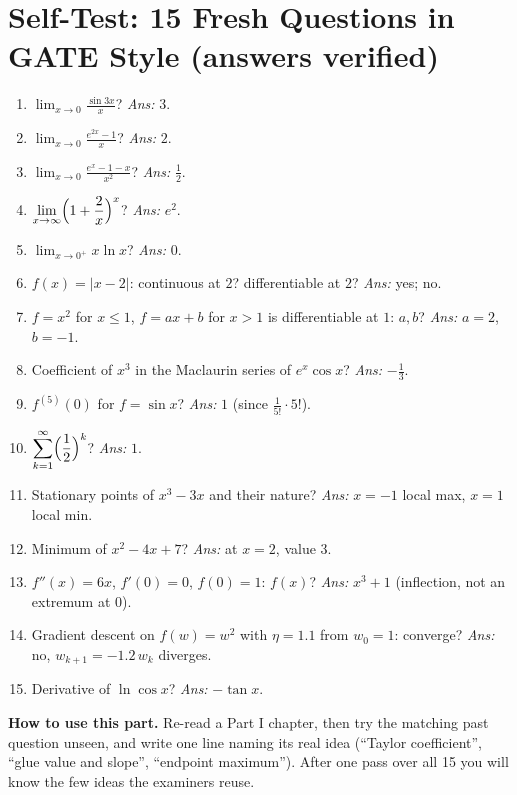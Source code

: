 \documentclass[11pt,a4paper]{article}
\begin{document}
\section{Self-Test: 15 Fresh Questions in GATE Style (answers verified)}
\begin{enumerate}[leftmargin=*,itemsep=3pt]
\item $\displaystyle\lim_{x\to0}\frac{\sin3x}{x}$? \emph{Ans:} $3$.
\item $\displaystyle\lim_{x\to0}\frac{e^{2x}-1}{x}$? \emph{Ans:} $2$.
\item $\displaystyle\lim_{x\to0}\frac{e^x-1-x}{x^2}$? \emph{Ans:} $\frac12$.
\item $\displaystyle\lim_{x\to\infty}\Bigl(1+\frac2x\Bigr)^x$? \emph{Ans:} $e^2$.
\item $\displaystyle\lim_{x\to0^+}x\ln x$? \emph{Ans:} $0$.
\item $f(x)=|x-2|$: continuous at $2$? differentiable at $2$? \emph{Ans:} yes; no.
\item $f=x^2$ for $x\le1$, $f=ax+b$ for $x>1$ is differentiable at $1$: $a,b$? \emph{Ans:} $a=2$, $b=-1$.
\item Coefficient of $x^3$ in the Maclaurin series of $e^x\cos x$? \emph{Ans:} $-\frac13$.
\item $f^{(5)}(0)$ for $f=\sin x$? \emph{Ans:} $1$ (since $\frac{1}{5!}\cdot5!$).
\item $\displaystyle\sum_{k=1}^\infty\Bigl(\frac12\Bigr)^k$? \emph{Ans:} $1$.
\item Stationary points of $x^3-3x$ and their nature? \emph{Ans:} $x=-1$ local max, $x=1$ local min.
\item Minimum of $x^2-4x+7$? \emph{Ans:} at $x=2$, value $3$.
\item $f''(x)=6x$, $f'(0)=0$, $f(0)=1$: $f(x)$? \emph{Ans:} $x^3+1$ (inflection, not an extremum at $0$).
\item Gradient descent on $f(w)=w^2$ with $\eta=1.1$ from $w_0=1$: converge? \emph{Ans:} no, $w_{k+1}=-1.2\,w_k$ diverges.
\item Derivative of $\ln\cos x$? \emph{Ans:} $-\tan x$.
\end{enumerate}

\begin{intuition}
\textbf{How to use this part.} Re-read a Part I chapter, then try the matching past question unseen, and write one line naming its real idea (``Taylor coefficient'', ``glue value and slope'', ``endpoint maximum''). After one pass over all 15 you will know the few ideas the examiners reuse.
\end{intuition}
\end{document}
